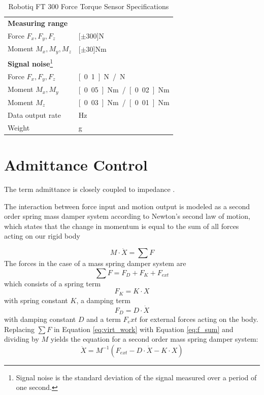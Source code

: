 \begin{savenotes}
\begin{table}[h]
\begin{center}
 \caption{Robotiq FT 300 Force Torque Sensor Specifications}\vspace{1ex}
 \label{tab:robotiq_ft}
 \begin{tabular}{ll}
 \hline
 \textbf{Measuring range} & \\
 Force $F_x, F_y, F_z$ & \unit[$\pm 300$]{N} \\
 Moment $M_x, M_y, M_z$ & \unit[$\pm 30$]{Nm} \\ \hline
 \textbf{Signal noise}\footnote{Signal noise is the standard deviation of the signal measured over a period of one second.} &\\
 Force $F_x, F_y, F_z$ & \unit[0.1]{N} / \unit[1]{N} \\
 Moment $M_x, M_y$ & \unit[0.05]{Nm} / \unit[0.02]{Nm} \\
 Moment $M_z$ & \unit[0.03]{Nm} / \unit[0.01]{Nm} \\ \hline
 Data output rate & \unit[100]{Hz} \\
 Weight & \unit[300]{g}\\
 \hline
 \end{tabular}
\end{center}
\end{table}
\end{savenotes}


\chapter{Admittance Control}
	\label{sec_adm_ctrl}
The term admittance is closely coupled to impedance \citep{hogan1985impedance}.

The interaction between force input and motion output is modeled as a second order spring mass damper system according to Newton's second law of motion, which states that the change in momentum is equal to the sum of all forces acting on our rigid body

\begin{equation}
M \cdot \ddot{X} = \sum F
	\label{eq:virt_work}
\end{equation}
The forces in the case of a mass spring damper system are
\begin{equation}
\sum F = F_D + F_K + F_{ext}
	\label{eq:f_sum}
\end{equation}
which consists of a spring term
\begin{equation}
F_K = K \cdot X
\end{equation}
with spring constant $K$, a damping term
\begin{equation}
F_D = D \cdot \dot{X}
\end{equation}
with damping constant $D$ and a term $F_ext$ for external forces acting on the body. Replacing $\sum F$ in Equation \ref{eq:virt_work} with Equation \ref{eq:f_sum} and dividing by $M$ yields the equation for a second order mass spring damper system:
\begin{equation}
\ddot{X} = M^{-1}(F_{ext} -D \cdot \dot{X} -K \cdot X)
	\label{eq:mass_spring_damper_sys}
\end{equation}




